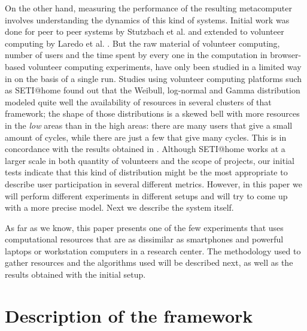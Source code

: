 \documentclass[journal,onecolumn]{IEEEtran}
\begin{document}
On the other hand, measuring the performance of the resulting metacomputer
involves understanding the dynamics of this kind of systems. Initial
work was done for peer to peer systems by Stutzbach et
al. \cite{stutzbach2006understanding} and extended to volunteer
computing by Laredo et al. \cite{churn08,laredo2008rcp}. But the raw material of
volunteer computing, %
number of users and the time spent by every one in the
computation in browser-based volunteer computing experiments, have
only been studied in a limited way in 
\cite{DBLP:journals/gpem/LaredoBGVAGF14} on the basis of a single
run. Studies using volunteer computing platforms such as SETI@home
\cite{javadi2009mining} found out that the Weibull, log-normal and
Gamma distribution 
modeled quite well the availability of resources in several clusters
of that framework; the shape of those distributions is a skewed bell
with more resources in the {\em low} areas than in the high areas:
there are many users that give a small amount of cycles, while there
are just a few that give many cycles. This is in concordance with the
results obtained in \cite{agajaj}. Although SETI@home works
at a larger scale in both quantity of volunteers and the scope of projects, 
our initial tests indicate that
this kind of distribution might be the most appropriate to describe
user participation in several different metrics. However, in this
paper we will perform different experiments in different setups and
will try to come up with a more precise model. Next we describe the
system itself.


As far as we know, this paper presents one of the few experiments that %
uses computational resources that are as dissimilar as smartphones and
powerful laptops 
or workstation computers in a research center. The methodology used
 to
gather resources and the algorithms used will be described next, as
well as the results obtained with the initial setup.

\section{Description of the framework}
\label{sec:description}
\end{document}
